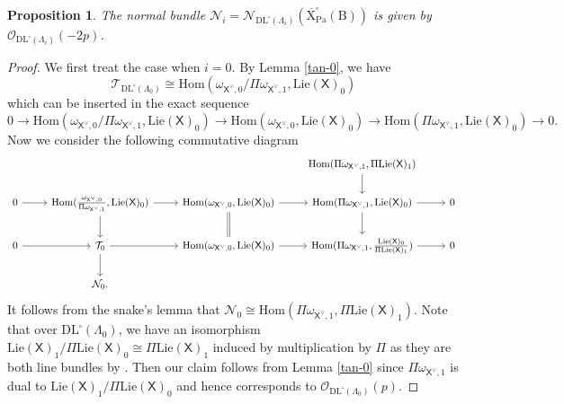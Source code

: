 \documentclass[10pt]{amsart}
\numberwithin{equation}{section}
\newtheorem{proposition}[equation]{Proposition}
\theoremstyle{definition}
\def\Lie{\mathrm{Lie}}
\def\Pa{\mathrm{Pa}}
\def\calN{\mathcal{N}}
\def\calO{\mathcal{O}}
\def\calT{\mathcal{T}}
\def\sfX{\mathsf{X}}
\def\rmB{\mathrm{B}}
\def\rmX{\mathrm{X}}
\begin{document}
\begin{proposition}\label{normal-square}
The normal bundle $\calN_{i}=\calN_{\mathrm{DL}^{\square}(\Lambda_{i})}({\overline{\rmX}^{\square}_{\Pa}(\rmB)})$ is given by $\calO_{\mathrm{DL}^{\square}(\Lambda_{i})}(-2p)$.
\end{proposition}
\begin{proof}
We first treat the case when $i=0$. By Lemma \ref{tan-0}, we have 
\begin{equation*}
\calT_{\mathrm{DL}^{\square}(\Lambda_{0})}\cong \mathrm{Hom}(\omega_{\sfX^{\vee},0}/\Pi\omega_{\sfX^{\vee},1}, \Lie(\sfX)_{0})
\end{equation*}
which can be inserted in the exact sequence
\begin{equation*}
0\rightarrow \mathrm{Hom}(\omega_{\sfX^{\vee},0}/\Pi\omega_{\sfX^{\vee},1}, \Lie(\sfX)_{0})\rightarrow \mathrm{Hom}(\omega_{\sfX^{\vee},0}, \Lie(\sfX)_{0})\rightarrow \mathrm{Hom}(\Pi\omega_{\sfX^{\vee},1}, \Lie(\sfX)_{0})\rightarrow 0.
\end{equation*}
Now we consider the following commutative diagram 
\begin{equation*}
\begin{tikzcd}
            &                       &                       & \mathrm{Hom}(\Pi\omega_{\sfX^{\vee},1}, \Pi\Lie(\sfX)_{1}) \arrow[d]           &   \\
0 \arrow[r] &\mathrm{Hom}(\frac{\omega_{\sfX^{\vee},0}}{\Pi \omega_{\sfX^{\vee},1}}, \Lie(\sfX)_{0})  \arrow[r] \arrow[d] &  \mathrm{Hom}(\omega_{\sfX^{\vee},0}, \Lie(\sfX)_{0})  \arrow[r] \arrow[d, Rightarrow, no head] & \mathrm{Hom}(\Pi\omega_{\sfX^{\vee},1}, \Lie(\sfX)_{0}) \arrow[r] \arrow[d] & 0 \\
0 \arrow[r] & \calT_{0}  \arrow[r] \arrow[d] & \mathrm{Hom}(\omega_{\sfX^{\vee},0}, \Lie(\sfX)_{0}) \arrow[r]           & \mathrm{Hom}(\Pi\omega_{\sfX^{\vee},1}, \frac{\Lie(\sfX)_{0}}{\Pi\Lie(\sfX)_{1}}) \arrow[r]           & 0 \\
            & \calN_{0}.                   &                       &                       &  
\end{tikzcd}
\end{equation*}
It follows from the snake's lemma that $\calN_{0}\cong \mathrm{Hom}(\Pi\omega_{\sfX^{\vee},1}, \Pi\Lie(\sfX)_{1})$. Note that over $\mathrm{DL}^{\square}(\Lambda_{0})$, we have an isomorphism $\Lie(\sfX)_{1}/\Pi\Lie(\sfX)_{0}\cong \Pi\Lie(\sfX)_{1}$ induced by multiplication by $\Pi$ as they are both line bundles by \cite[2.5]{Wanga}. Then our claim follows from Lemma \ref{tan-0} since $\Pi \omega_{\sfX^{\vee},1}$ is dual to $\Lie(\sfX)_{1}/\Pi\Lie(\sfX)_{0}$ and hence corresponds to $\calO_{\mathrm{DL}^{\square}(\Lambda_{0})}(p)$.


\end{proof}
\end{document}
